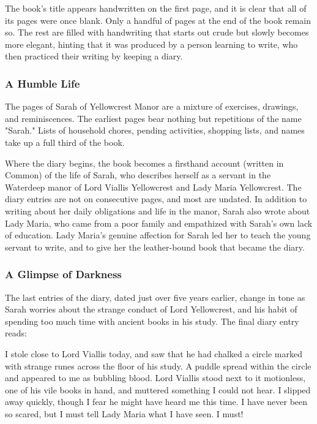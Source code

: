 \documentclass[10pt,a4paper,twoside,bg=print,twocolumn,openany,nodeprecatedcode]{dndbook}
\begin{document}
The book's title appears handwritten on the first page, and it is clear that all of its pages were once blank. Only a handful of pages at the end of the book remain so. The rest are filled with handwriting that starts out crude but slowly becomes more elegant, hinting that it was produced by a person learning to write, who then practiced their writing by keeping a diary.

\subsubsection{A Humble Life}
The pages of Sarah of Yellowcrest Manor are a mixture of exercises, drawings, and reminiscences. The earliest pages bear nothing but repetitions of the name "Sarah." Lists of household chores, pending activities, shopping lists, and names take up a full third of the book.

Where the diary begins, the book becomes a firsthand account (written in Common) of the life of Sarah, who describes herself as a servant in the Waterdeep manor of Lord Viallis Yellowcrest and Lady Maria Yellowcrest. The diary entries are not on consecutive pages, and most are undated. In addition to writing about her daily obligations and life in the manor, Sarah also wrote about Lady Maria, who came from a poor family and empathized with Sarah's own lack of education. Lady Maria's genuine affection for Sarah led her to teach the young servant to write, and to give her the leather-bound book that became the diary.

\subsubsection{A Glimpse of Darkness}
The last entries of the diary, dated just over five years earlier, change in tone as Sarah worries about the strange conduct of Lord Yellowcrest, and his habit of spending too much time with ancient books in his study. The final diary entry reads:

\begin{DndReadAloud}{}
I stole close to Lord Viallis today, and saw that he had chalked a circle marked with strange runes across the floor of his study. A puddle spread within the circle and appeared to me as bubbling blood. Lord Viallis stood next to it motionless, one of his vile books in hand, and muttered something I could not hear. I slipped away quickly, though I fear he might have heard me this time. I have never been so scared, but I must tell Lady Maria what I have seen. I must!

\end{DndReadAloud}
\end{document}
